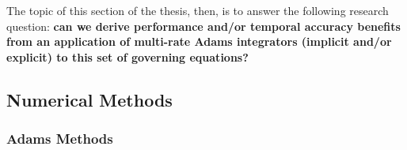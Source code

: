 The topic of this section of the thesis, then, is to answer the following
research question: \textbf{can we derive performance and/or temporal accuracy benefits
from an application of multi-rate Adams integrators (implicit and/or explicit) to this
set of governing equations?}


\subsection{Numerical Methods}

\subsubsection{Adams Methods}

